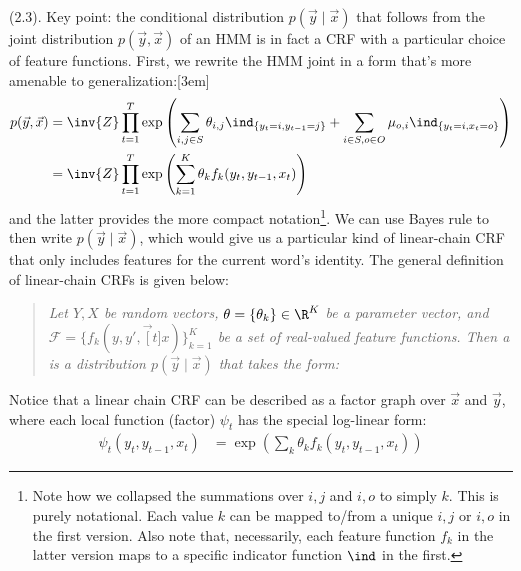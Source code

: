 \documentclass[11pt]{article}
\begin{document}
\myspace{}
\p {} (2.3). Key point: the conditional distribution $p(\vec{y} \mid \vec{x})$ that follows from the joint distribution $p(\vec{y}, \vec{x})$ of an HMM is in fact a CRF with a particular choice of feature functions. First, we rewrite the HMM joint in a form that's more amenable to generalization:[3em]
\begin{align}
p(\vec{y}, \vec{x}) &= \inv{Z} 
\prod_{t =1}^{T} \exp \left( 
\sum_{i,j \in S} \theta_{i,j} \ind_{  \{ y_t=i, y_{t-1}=j  \} }   
+ \sum_{i \in S, o \in O} \mu_{o,i} \ind_{ \{  y_t=i, x_t=o \}  }
\right) \\
&= \inv{Z} \prod_{t = 1}^{T} \exp \left(
\sum_{k = 1}^{K} \theta_k f_k(y_t, y_{t - 1}, x_t)
\right)
\end{align}
and the latter provides the more compact notation\footnote{Note how we collapsed the summations over $i,j$ and $i,o$ to simply $k$. This is purely notational. Each value $k$ can be mapped to/from a unique $i,j$ or $i,o$ in the first version. Also note that, necessarily, each feature function $f_k$ in the latter version maps to a specific indicator function $\ind$ in the first.}. We can use Bayes rule to then write $p(\vec{y} \mid \vec{x})$, which would give us a particular kind of linear-chain CRF that only includes features for the current word's identity. The general definition of linear-chain CRFs is given below:
\vspace{-0.7em}
\begin{quote}
	{\small\itshape
		Let $Y, X$ be random vectors, $\theta = \{\theta_k\} \in \R^K$ be a parameter vector, and $\mathcal{F} = \{f_k(y, y', \vec[t]{x})\}_{k = 1}^{K}$ be a set of real-valued feature functions. Then a  is a distribution $p(\vec{y} \mid \vec{x})$ that takes the form:}
\end{quote}
Notice that a linear chain CRF can be described as a factor graph over $\vec{x}$ and $\vec{y}$, where each local function (factor) $\psi_t$ has the special log-linear form:
\begin{align}
\psi_t(y_t, y_{t-1}, x_t) &= \exp \left(
\sum_k \theta_k f_k(y_t, y_{t - 1}, x_t)
\right)
\end{align}
\end{document}
